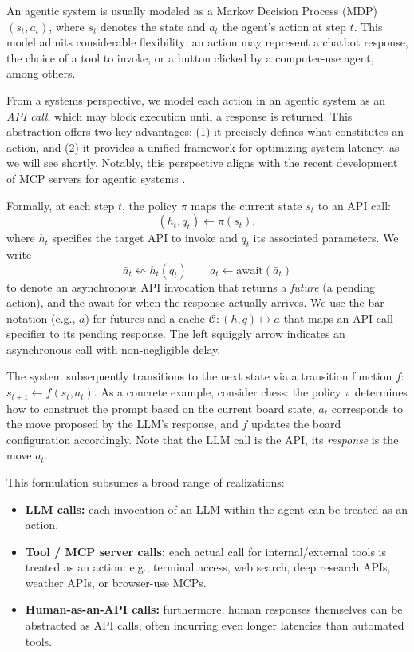 An agentic system is usually modeled as a Markov Decision Process (MDP) $(s_{t}, a_{t})$, where $s_{t}$ denotes the state and $a_{t}$ the agent’s action at step $t$. 
This model admits considerable flexibility: an action may represent a chatbot response, the choice of a tool to invoke, or a button clicked by a computer-use agent, among others.  

From a systems perspective, we model each action in an agentic system as an \emph{API call}, which may block execution until a response is returned. This abstraction offers two key advantages: (1) it precisely defines what constitutes an action, and (2) it provides a unified framework for optimizing system latency, as we will see shortly.
Notably, this perspective aligns with the recent development of MCP servers for agentic systems \citep{anthropic2024model}.

Formally, at each step $t$, the policy $\pi$ maps the current state $s_{t}$ to an API call:
\[
(h_{t}, q_{t}) \gets \pi(s_{t}),
\]
where $h_{t}$ specifies the target API to invoke and $q_{t}$ its associated parameters. We write
\[\bar a_t \leftsquigarrow h_t(q_t)\qquad a_t \gets \mathrm{await}(\bar a_t)\] 
to denote an asynchronous API invocation that
returns a \emph{future} (a pending action), and the await for when the response actually arrives. We use the bar notation (e.g., $\bar a$) for futures and
a cache $\mathcal C:(h,q)\mapsto \bar a$ that maps an API call specifier to its pending response. The left squiggly arrow indicates an asynchronous call with non-negligible delay.

The system subsequently transitions to the next state via a transition function $f$: $
s_{t+1} \gets f(s_{t}, a_{t}).$
As a concrete example, consider chess: the policy $\pi$ determines how to construct the prompt 
based on the current board state, $a_{t}$ corresponds to the move proposed by the LLM’s response, 
and $f$ updates the board configuration accordingly. Note that the LLM call is the API, its \textit{response} is the move $a_t$. 


This formulation subsumes a broad range of realizations:
\begin{itemize}[leftmargin=*]
    \item \textbf{LLM calls:} each invocation of an LLM within the agent can be treated as an action.
    \item \textbf{Tool / MCP server calls:} each actual call for internal/external tools is treated as an action: e.g., terminal access, web search, deep research APIs, weather APIs, or browser-use MCPs.
    \item \textbf{Human-as-an-API calls:} furthermore, human responses themselves can be abstracted as API calls, often incurring even longer latencies than automated tools.
\end{itemize}

